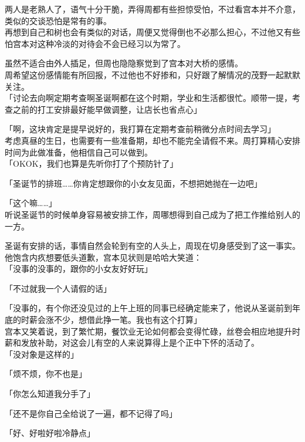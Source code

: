 两人是老熟人了，语气十分干脆，弄得周都有些担惊受怕，不过看宫本并不介意，类似的交谈恐怕是常有的事。\\

再想到自己和树也会有类似的对话，周便又觉得倒也不必那么担心，不过他又有些怕宫本对这种冷淡的对待会不会已经习以为常了。

虽然不适合由外人插足，但周也隐隐察觉到了宫本对大桥的感情。\\

周希望这份感情能有所回报，不过他也不好掺和，只好跟了解情况的茂野一起默默关注。\\

「讨论去向啊定期考查啊圣诞啊都在这个时期，学业和生活都很忙。顺带一提，考查之前的打工安排最好能早做调整，让店长也省点心」

「啊，这块肯定是提早说好的，我打算在定期考查前稍微分点时间去学习」\\

考虑真昼的生日，也需要有一些准备期，却也不能完全请假不来。周打算精心安排时间为此做准备，他相信自己可以做到。\\

「OKOK，我们也算是先听你打了个预防针了」

「圣诞节的排班……你肯定想跟你的小女友见面，不想把她抛在一边吧」

「这个嘛……」\\

听说圣诞节的时候单身容易被安排工作，周哪想得到自己成为了把工作推给别人的一方。

圣诞有安排的话，事情自然会轮到有空的人头上，周现在切身感受到了这一事实。他饱含内疚想要低头道歉，宫本见状则是哈哈大笑道：\\

「没事的没事的，跟你的小女友好好玩」

「不过就我一个人请假的话」

「没事的，有个你还没见过的上午上班的同事已经确定能来了，他说从圣诞前到年底的时薪会涨不少，想借此挣一笔。我也有这个打算」\\

宫本又笑着说，到了繁忙期，餐饮业无论如何都会变得忙碌，丝卷会相应地提升时薪和发放补助，对这会儿有空的人来说算得上是个正中下怀的活动了。\\

「没对象是这样的」

「烦不烦，你不也是」

「你怎么知道我分手了」

「还不是你自己全给说了一遍，都不记得了吗」

「好、好啦好啦冷静点」\\

